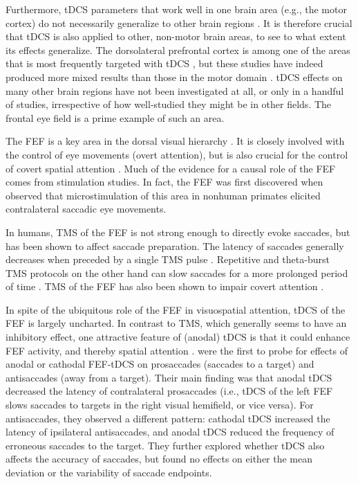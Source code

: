 \documentclass[11pt,]{memoir}
\begin{document}
Furthermore, tDCS parameters that work well in one brain area (e.g., the motor cortex) do not necessarily generalize to other brain regions \autocites{Parkin2015}{Bestmann2017}. It is therefore crucial that tDCS is also applied to other, non-motor brain areas, to see to what extent its effects generalize. The dorsolateral prefrontal cortex is among one of the areas that is most frequently targeted with tDCS \autocite{Santarnecchi2015}, but these studies have indeed produced more mixed results than those in the motor domain \autocite{Tremblay2014a}. tDCS effects on many other brain regions have not been investigated at all, or only in a handful of studies, irrespective of how well-studied they might be in other fields. The frontal eye field is a prime example of such an area.

The FEF is a key area in the dorsal visual hierarchy \autocites{Schall2009}{Corbetta2002}. It is closely involved with the control of eye movements (overt attention), but is also crucial for the control of covert spatial attention \autocites{Nobre2000}{Grosbras2005}. Much of the evidence for a causal role of the FEF comes from stimulation studies. In fact, the FEF was first discovered when \textcite{Ferrier1873} observed that microstimulation of this area in nonhuman primates elicited contralateral saccadic eye movements.

In humans, TMS of the FEF is not strong enough to directly evoke saccades, but has been shown to affect saccade preparation. The latency of saccades generally decreases when preceded by a single TMS pulse \autocites{Thickbroom1996}{Ro2002}{Juan2008}. Repetitive and theta-burst TMS protocols on the other hand can slow saccades for a more prolonged period of time \autocite{Nyffeler2006}. TMS of the FEF has also been shown to impair covert attention \autocite{Capotosto2009}.

In spite of the ubiquitous role of the FEF in visuospatial attention, tDCS of the FEF is largely uncharted. In contrast to TMS, which generally seems to have an inhibitory effect, one attractive feature of (anodal) tDCS is that it could enhance FEF activity, and thereby spatial attention \autocite{Reteig2017}. \textcite{Kanai2012} were the first to probe for effects of anodal or cathodal FEF-tDCS on prosaccades (saccades to a target) and antisaccades (away from a target). Their main finding was that anodal tDCS decreased the latency of contralateral prosaccades (i.e., tDCS of the left FEF slows saccades to targets in the right visual hemifield, or vice versa). For antisaccades, they observed a different pattern: cathodal tDCS increased the latency of ipsilateral antisaccades, and anodal tDCS reduced the frequency of erroneous saccades to the target. They further explored whether tDCS also affects the accuracy of saccades, but found no effects on either the mean deviation or the variability of saccade endpoints.
\end{document}
